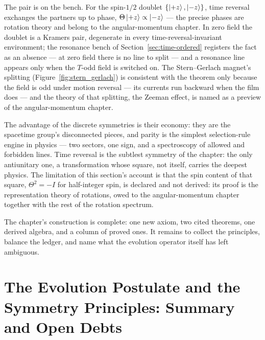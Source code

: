 The pair is on the bench. For the spin-$1/2$ doublet $\{\ket{+z},\ket{-z}\}$, time reversal exchanges the partners up to phase, $\Theta\ket{+z} \propto \ket{-z}$ --- the precise phases are rotation theory and belong to the angular-momentum chapter. In zero field the doublet is a Kramers pair, degenerate in every time-reversal-invariant environment; the resonance bench of Section~\ref{sec:time-ordered} registers the fact as an absence --- at zero field there is no line to split --- and a resonance line appears only when the $T$-odd field is switched on. The Stern--Gerlach magnet's splitting (Figure~\ref{fig:stern_gerlach}) is consistent with the theorem only because the field is odd under motion reversal --- its currents run backward when the film does --- and the theory of that splitting, the Zeeman effect, is named as a preview of the angular-momentum chapter.

The advantage of the discrete symmetries is their economy: they are the spacetime group's disconnected pieces, and parity is the simplest selection-rule engine in physics --- two sectors, one sign, and a spectroscopy of allowed and forbidden lines. Time reversal is the subtlest symmetry of the chapter: the only antiunitary one, a transformation whose square, not itself, carries the deepest physics. The limitation of this section's account is that the spin content of that square, $\Theta^2 = -I$ for half-integer spin, is declared and not derived: its proof is the representation theory of rotations, owed to the angular-momentum chapter together with the rest of the rotation spectrum.

The chapter's construction is complete: one new axiom, two cited theorems, one derived algebra, and a column of proved ones. It remains to collect the principles, balance the ledger, and name what the evolution operator itself has left ambiguous.

\section{The Evolution Postulate and the Symmetry Principles: Summary and Open Debts}
\label{sec:ch4summary}


